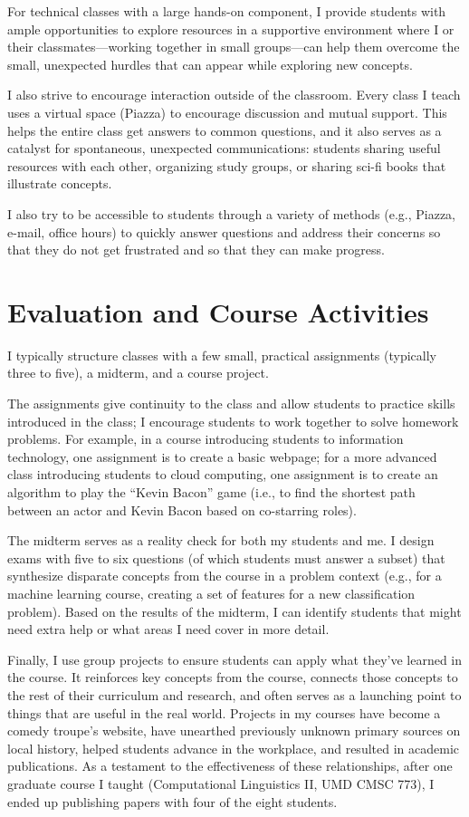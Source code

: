 \documentclass[11pt]{amsart}
\begin{document}
For technical classes with a large hands-on component, I provide
students with ample opportunities to explore resources in a supportive
environment where I or their classmates---working together in small
groups---can help them overcome the small, unexpected hurdles that can
appear while exploring new concepts.

I also strive to encourage interaction outside of the classroom.  Every class I
teach uses a virtual space (Piazza) to encourage discussion and mutual support.  This
helps the entire class get answers to common questions, and it also serves as a
catalyst for spontaneous, unexpected communications: students sharing useful
resources with each other, organizing study groups, or sharing sci-fi books that
illustrate concepts.

I also try to be accessible to students through a variety of methods (e.g.,
Piazza, e-mail, office hours) to quickly answer questions and address their
concerns so that they do not get frustrated and so that they can make progress.

\section{Evaluation and Course Activities}

I typically structure classes with a few small, practical assignments (typically
three to five), a midterm, and a course project.

The assignments give continuity to the class and allow students to practice
skills introduced in the class; I encourage students to work together to solve
homework problems.  For example, in a course introducing students to information
technology, one assignment is to create a basic webpage; for a more advanced
class introducing students to cloud computing, one assignment is to create an
algorithm to play the ``Kevin Bacon'' game (i.e., to find the shortest path
between an actor and Kevin Bacon based on co-starring roles).

The midterm serves as a reality check for both my students and me.  I design
exams with five to six questions (of which students must answer a subset) that
synthesize disparate concepts from the course in a problem context (e.g., for a
machine learning course, creating a set of features for a new classification
problem).  Based on the results of the midterm, I can identify students that
might need extra help or what areas I need cover in more detail.

Finally, I use group projects to ensure students can apply what
they've learned in the course.  It reinforces key concepts from the
course, connects those concepts to the rest of their curriculum and
research, and often serves as a launching point to things that are
useful in the real world.  Projects in my courses have become a comedy
troupe's website, have unearthed previously unknown primary sources on
local history, helped students advance in the workplace, and resulted
in academic publications.  As a testament to the effectiveness of
these relationships, after one graduate course I taught (Computational
Linguistics II, UMD CMSC 773), I ended up publishing papers with four
of the eight students.
\end{document}
